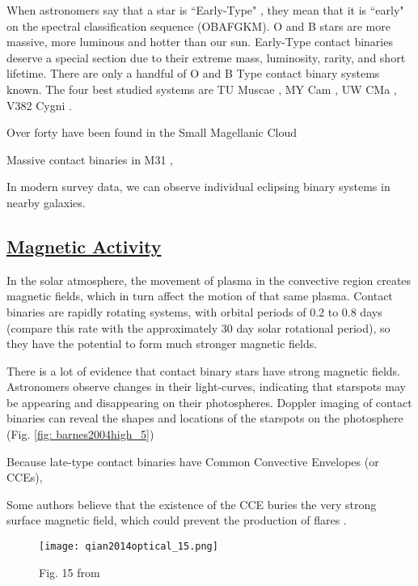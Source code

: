 \documentclass[12pt]{article} %
\numberwithin{equation}{section} %
\begin{document}
When astronomers say that a star is ``Early-Type" , they mean that it is ``early" on the spectral classification sequence (OBAFGKM). O and B stars are more massive, more luminous and hotter than our sun. Early-Type contact binaries deserve a special section due to their extreme mass, luminosity, rarity, and short lifetime. There are only a handful of O and B Type contact binary systems known. The four best studied systems are TU Muscae \citep{penny2008tomographic}, MY Cam \citep{lorenzo2014my}, UW CMa \citep{antokhina2011light}, V382 Cygni \citep{popper1978masses}. 

Over forty have been found in the Small Magellanic Cloud \citep{hilditch2005forty}

Massive contact binaries in M31 \citep{lee2014properties}, \citep{vilardell2006eclipsing}

In modern survey data, we can observe individual eclipsing binary systems in nearby galaxies.


\subsection[Magnetic Activity]{\hyperlink{toc}{Magnetic Activity}}

In the solar atmosphere, the movement of plasma in the convective region creates magnetic fields, which in turn affect the motion of that same plasma. Contact binaries are rapidly rotating systems, with orbital periods of 0.2 to 0.8 days (compare this rate with the approximately 30 day solar rotational period), so they have the potential to form much stronger magnetic fields.

There is a lot of evidence that contact binary stars have strong magnetic fields. Astronomers observe changes in their light-curves, indicating that starspots may be appearing and disappearing on their photospheres. Doppler imaging of contact binaries can reveal the shapes and locations of the starspots on the photosphere (Fig. \ref{fig: barnes2004high_5})

 Because late-type contact binaries have Common Convective Envelopes (or CCEs), 

Some authors believe that the existence of the CCE buries the very strong surface magnetic field, which could prevent the production of flares \citep{qian2014optical}. 

\begin{figure}[H]
\centering
\texttt{[image: qian2014optical\_15.png]}
\caption{Fig. 15 from \citet{qian2014optical}}
\label{fig: qian2014optical_15}
\end{figure}
\end{document}
